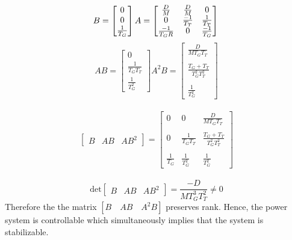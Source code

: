 \documentclass[journal]{IEEEtran}
\begin{document}
\begin{equation}
B =
\begin{bmatrix}
0 \\
 0 \\
 \frac{1}{T_{G}}
\end{bmatrix}
A =
\begin{bmatrix}
\frac{D}{M} & \frac{D}{M} & 0 \\
 0 & \frac{-1}{T_{T}} & \frac{1}{T_{T}}\\
 \frac{-1}{T_{G}R} & 0 & \frac{-1}{T_{G}} \\
\end{bmatrix} \\
\end{equation}
\newline
\begin{equation}
AB =
\begin{bmatrix}
0 \\
 \frac{1}{T_{G}T_{T}} \\
 \frac{1}{T_{G}^2}
\end{bmatrix}
A^2B =
\begin{bmatrix}
\frac{D}{MT_{G}T_{T}} \\ \\
 \frac{T_{G} + T_{T}}{T_{G}^2T_{T}^2} \\ \\
 \frac{1}{T_{G}^2}
\end{bmatrix}
\end{equation}
\\
\begin{equation}
\begin{bmatrix}
B & AB & AB^2 
\end{bmatrix}
= 
\begin{bmatrix}
0 &  0 & \frac{D}{MT_{G}T_{T}} \\ \\
0 & \frac{1}{T_{G}T_{T}} & \frac{T_{G} + T_{T}}{T_{G}^2T_{T}^2} \\ \\
 \frac{1}{T_{G}}  & \frac{1}{T_{G}^2} &  \frac{1}{T_{G}^2}
\end{bmatrix}
\end{equation}
\\
\begin{equation}
\text{det}
\begin{bmatrix}
B & AB & AB^2 
\end{bmatrix}
= \frac{-D}{MT_{G}^3T_{T}^2} \neq 0
\end{equation}
Therefore the the matrix $[B \quad AB \quad A^2B]$ preserves rank. Hence, the power system is controllable which simultaneously implies that the system is stabilizable.
\end{document}
